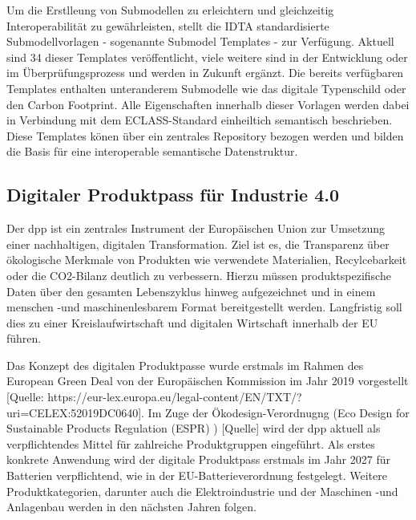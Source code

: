 Um die Erstlleung von Submodellen zu erleichtern und gleichzeitig Interoperabilität zu gewährleisten, stellt die IDTA standardisierte Submodellvorlagen - sogenannte Submodel Templates - zur Verfügung.
Aktuell sind 34 dieser Templates veröffentlicht, viele weitere sind in der Entwicklung oder im Überprüfungsprozess und werden in Zukunft ergänzt.
Die bereits verfügbaren Templates enthalten unteranderem Submodelle wie das digitale Typenschild oder den Carbon Footprint.
Alle Eigenschaften innerhalb dieser Vorlagen werden dabei in Verbindung mit dem ECLASS-Standard einheiltich semantisch beschrieben.
Diese Templates könen über ein zentrales Repository bezogen werden und bilden die Basis für eine interoperable semantische Datenstruktur.


\subsection{Digitaler Produktpass für Industrie 4.0}
Der \ac{dpp} ist ein zentrales Instrument der Europäischen Union zur Umsetzung einer nachhaltigen, digitalen Transformation.
Ziel ist es, die Transparenz über ökologische Merkmale von Produkten wie verwendete Materialien, Recylcebarkeit oder die CO2-Bilanz deutlich zu verbessern.
Hierzu müssen produktspezifische Daten über den gesamten Lebenszyklus hinweg aufgezeichnet und in einem menschen -und maschinenlesbarem Format bereitgestellt werden.
Langfristig soll dies zu einer Kreislaufwirtschaft und digitalen Wirtschaft innerhalb der EU führen.

Das Konzept des digitalen Produktpasse wurde erstmals im Rahmen des European Green Deal von der Europäischen Kommission im Jahr 2019 vorgestellt [Quelle: https://eur-lex.europa.eu/legal-content/EN/TXT/?uri=CELEX:52019DC0640].
Im Zuge der Ökodesign-Verordnugng (Eco Design for Sustainable Products Regulation (ESPR) ) [Quelle] wird der \acs{dpp} aktuell als verpflichtendes Mittel für zahlreiche Produktgruppen eingeführt.
Als erstes konkrete Anwendung wird der digitale Produktpass erstmals im Jahr 2027 für Batterien verpflichtend, wie in der EU-Batterieverordnung festgelegt.
Weitere Produktkategorien, darunter auch die Elektroindustrie und der Maschinen -und Anlagenbau werden in den nächsten Jahren folgen.

